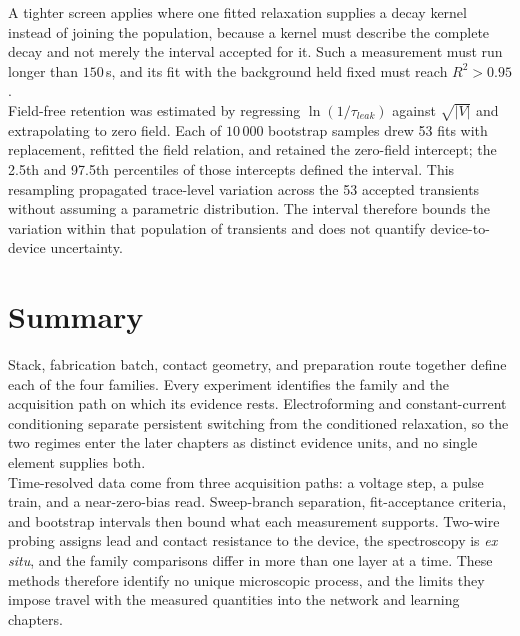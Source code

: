 \noindent A tighter screen applies where one fitted relaxation supplies a decay kernel instead of joining the
population, because a kernel must describe the complete decay and not merely the interval accepted for it. Such a
measurement must run longer than $150$\,s, and its fit with the background held fixed must reach $R^2>0.95$.\\

\noindent Field-free retention was estimated by regressing $\ln(1/\tau_{leak})$ against $\sqrt{|V|}$ and
extrapolating to zero field. Each of $10\,000$ bootstrap samples drew 53 fits with replacement, refitted the
field relation, and retained the zero-field intercept; the 2.5th and 97.5th percentiles of those intercepts defined
the interval. This resampling propagated trace-level variation across the 53 accepted transients without assuming a
parametric distribution. The interval therefore bounds the variation within that population of transients and does
not quantify device-to-device uncertainty.

\FloatBarrier

\section[Summary]{Summary}

\noindent Stack, fabrication batch, contact geometry, and preparation route together define each of the four
 families. Every experiment identifies the family and the acquisition path on which its evidence rests.
Electroforming and constant-current conditioning separate persistent switching from the conditioned relaxation, so
the two regimes enter the later chapters as distinct evidence units, and no single element supplies both.\\

\noindent Time-resolved data come from three acquisition paths: a voltage step, a pulse train, and a near-zero-bias
read. Sweep-branch separation, fit-acceptance criteria, and bootstrap intervals then bound what each measurement
supports. Two-wire probing assigns lead and contact
resistance to the device, the spectroscopy is \emph{ex situ}, and the family comparisons differ in more than one layer
at a time. These methods therefore identify no unique microscopic process, and the limits they impose travel with the
measured quantities into the network and learning chapters.
